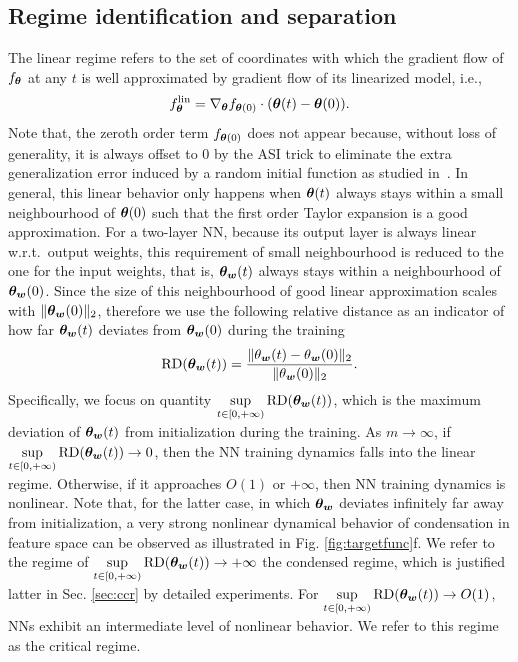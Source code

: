 \documentclass[twoside,11pt]{article}
\begin{document}
\subsection{Regime identification and separation}
The linear regime refers to the set of coordinates with which the gradient flow of $f_{\bm{\theta}}$ at any $t$ is well approximated by gradient flow of its linearized model, i.e.,
\begin{equation}
    f^{\mathrm{lin}}_{\bm{\theta}}=\nabla_{\bm{\theta}}f_{\bm{\theta}(0)}\cdot(\bm{\theta}(t)-\bm{\theta}(0)).
\end{equation}
Note that, the zeroth order term $f_{\bm{\theta}(0)}$ does not appear because, without loss of generality, it is always offset to $0$ by the ASI trick to eliminate the extra generalization error induced by a random initial function as studied in~\cite{zhang_type_2019}. In general, this linear behavior only happens when $\bm{\theta}(t)$ always stays within a small neighbourhood of $\bm{\theta}(0)$ such that the first order Taylor expansion is a good approximation. For a two-layer NN, because its output layer is always linear w.r.t.\  output weights, this requirement of small neighbourhood is reduced to the one for the input weights, that is, $\bm{\theta}_{\bm{w}}(t)$ always stays within a neighbourhood of $\bm{\theta}_{\bm{w}}(0)$. Since the size of this neighbourhood of good linear approximation scales with $\lVert\bm{\theta}_{\bm{w}}(0)\rVert_{2}$, therefore we use the following relative distance as an indicator of how far $\bm{\theta}_{\bm{w}}(t)$ deviates from $\bm{\theta}_{\bm{w}}(0)$ during the training
\begin{equation}
    \mathrm{RD}(\bm{\theta}_{\bm{w}}(t))=\frac{\lVert\theta_{\bm{w}}(t)-\theta_{\bm{w}}(0)\rVert_{2}}{\lVert\theta_{\bm{w}}(0)\rVert_{2}}.
\end{equation}
Specifically, we focus on quantity $\sup\limits_{t\in[0,+\infty)}\mathrm{RD}(\bm{\theta}_{\bm{w}}(t))$, which is the maximum deviation of $\bm{\theta}_{\bm{w}}(t)$ from initialization during the training. As $m\to\infty$, if $\sup\limits_{t\in[0,+\infty)}\mathrm{RD}(\bm{\theta}_{\bm{w}}(t))\to 0$, then the NN training dynamics falls into the linear regime. Otherwise, if it approaches $O(1)$ or $+\infty$, then NN training dynamics is nonlinear. Note that, for the latter case, in which $\bm{\theta}_{\bm{w}}$ deviates infinitely far away from initialization, a very strong nonlinear dynamical behavior of condensation in feature space can be observed as illustrated in Fig. \ref{fig:targetfunc}f. We refer to the regime of $\sup\limits_{t\in[0,+\infty)}\mathrm{RD}(\bm{\theta}_{\bm{w}}(t))\to +\infty$ the condensed regime, which is justified latter in Sec. \ref{sec:ccr} by detailed experiments. For $\sup\limits_{t\in[0,+\infty)}\mathrm{RD}(\bm{\theta}_{\bm{w}}(t))\to O(1)$, NNs exhibit an intermediate level of nonlinear behavior. We refer to this regime as the critical regime.
\end{document}
